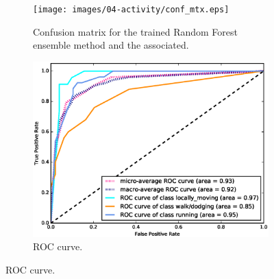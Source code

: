 \begin{figure}[thpb]
    \centering
    \begin{subfigure}[b]{\textwidth}
       \centering
       \texttt{[image: images/04-activity/conf\_mtx.eps]}
       \caption{Confusion matrix for the trained Random Forest ensemble method and the associated.}
	\end{subfigure}
    \begin{subfigure}[b]{\textwidth}
     	\centering
        \includegraphics[width=12cm]{images/04-activity/roc.eps}
        \caption{ROC curve.}
	\end{subfigure}
    \label{running}
\end{figure}

%
%

